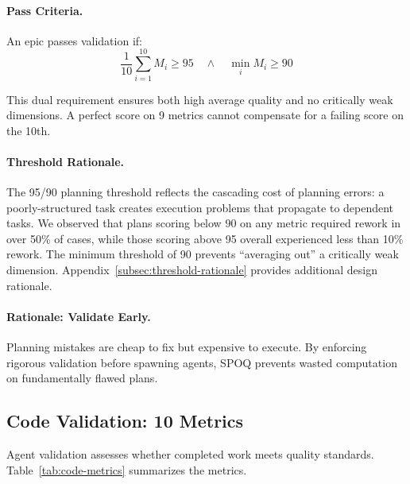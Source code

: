 \paragraph{Pass Criteria.}
An epic passes validation if:
\begin{equation}
\frac{1}{10}\sum_{i=1}^{10} M_i \geq 95 \quad \land \quad \min_i M_i \geq 90
\end{equation}

This dual requirement ensures both high average quality and no critically
weak dimensions. A perfect score on 9 metrics cannot compensate for a
failing score on the 10th.

\paragraph{Threshold Rationale.}
The 95/90 planning threshold reflects the cascading cost of planning errors:
a poorly-structured task creates execution problems that propagate to dependent
tasks. We observed that plans scoring below 90 on any metric required rework
in over 50\% of cases, while those scoring above 95 overall experienced less
than 10\% rework. The minimum threshold of 90 prevents ``averaging out'' a
critically weak dimension. Appendix~\ref{subsec:threshold-rationale}
provides additional design rationale.

\paragraph{Rationale: Validate Early.}
Planning mistakes are cheap to fix but expensive to execute. By enforcing
rigorous validation before spawning agents, SPOQ prevents wasted computation
on fundamentally flawed plans.

\newpage
\subsection{Code Validation: 10 Metrics}
\label{subsec:code-validation}

Agent validation assesses whether completed work meets quality standards.
Table~\ref{tab:code-metrics} summarizes the metrics.


